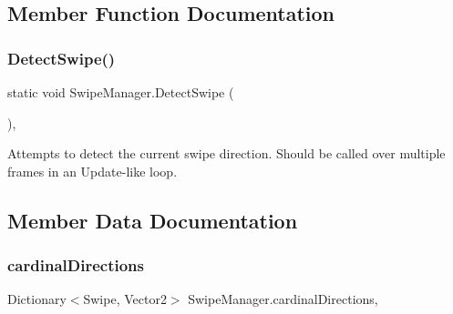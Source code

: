 \subsection{Member Function Documentation}
\mbox{\label{class_swipe_manager_aba02a3bfacb5b0b8f6511bdf625158a5}} 
\subsubsection{\texorpdfstring{DetectSwipe()}{DetectSwipe()}}
{\footnotesize\ttfamily static void Swipe\+Manager.\+Detect\+Swipe (\begin{DoxyParamCaption}{ }\end{DoxyParamCaption})\hspace{0.3cm}{\ttfamily [static]}, {\ttfamily [private]}}



Attempts to detect the current swipe direction. Should be called over multiple frames in an Update-\/like loop. 



\subsection{Member Data Documentation}
\mbox{\label{class_swipe_manager_a2f95e1ff771757aade55920e63a9f4e5}} 
\subsubsection{\texorpdfstring{cardinalDirections}{cardinalDirections}}
{\footnotesize\ttfamily Dictionary$<$Swipe, Vector2$>$ Swipe\+Manager.\+cardinal\+Directions\hspace{0.3cm}{\ttfamily [static]}, {\ttfamily [private]}}

